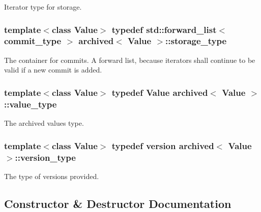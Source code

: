 Iterator type for storage. 

\hypertarget{classarchived_afc884a6d27f4c8fde4d0c2d658f1bc60}{}
\subsubsection[{storage\+\_\+type}]{\setlength{\rightskip}{0pt plus 5cm}template$<$class Value$>$ typedef std\+::forward\+\_\+list$<$ {\bf commit\+\_\+type} $>$ {\bf archived}$<$ Value $>$\+::{\bf storage\+\_\+type}\hspace{0.3cm}{\ttfamily [private]}}\label{classarchived_afc884a6d27f4c8fde4d0c2d658f1bc60}


The container for commits. A forward list, because iterators shall continue to be valid if a new commit is added. 

\hypertarget{classarchived_a0f6c13c55e504fe3bbfc04f3896e5abc}{}
\subsubsection[{value\+\_\+type}]{\setlength{\rightskip}{0pt plus 5cm}template$<$class Value$>$ typedef Value {\bf archived}$<$ Value $>$\+::{\bf value\+\_\+type}}\label{classarchived_a0f6c13c55e504fe3bbfc04f3896e5abc}


The archived value\textquotesingle{}s type. 

\hypertarget{classarchived_a75b8e571e7c6aca9432b9aa2ba601c00}{}
\subsubsection[{version\+\_\+type}]{\setlength{\rightskip}{0pt plus 5cm}template$<$class Value$>$ typedef {\bf version} {\bf archived}$<$ Value $>$\+::{\bf version\+\_\+type}}\label{classarchived_a75b8e571e7c6aca9432b9aa2ba601c00}


The type of versions provided. 



\subsection{Constructor \& Destructor Documentation}
\hypertarget{classarchived_a752f1c457d9431caab148b866fc34c0f}{}
